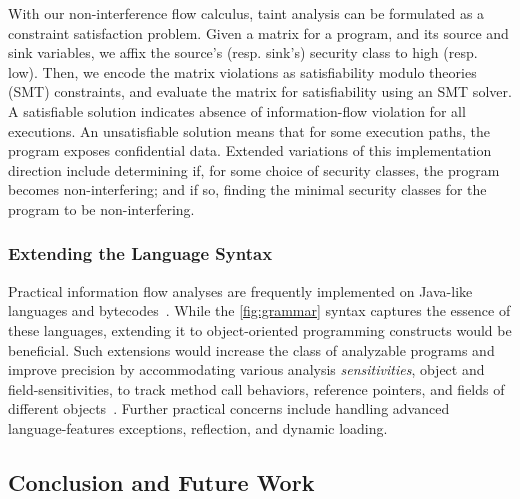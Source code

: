 With our non-interference flow calculus, taint analysis can be formulated as a constraint satisfaction problem.
Given a matrix for a program, and its source and sink variables,
we affix the source's (resp. sink's) security class to high (resp. low).
Then, we encode the matrix violations as satisfiability modulo theories (SMT) constraints, and evaluate the matrix for satisfiability using an SMT solver.
A satisfiable solution indicates absence of information-flow violation for all executions.
An unsatisfiable solution means that for some execution paths, the program exposes confidential data.
Extended variations of this implementation direction include
determining if, for some choice of security classes, the program becomes non-interfering;
and if so, finding the minimal security classes for the program to be non-interfering.

\subsubsection{Extending the Language Syntax}

Practical information flow analyses are frequently implemented on Java-like languages and bytecodes~\cite{hammer2009,huang2014,arzt2014,pauck2018}.
While the \autoref{fig:grammar} syntax captures the essence of these languages, extending it to object-oriented programming constructs would be beneficial.
Such extensions would increase the class of analyzable programs and improve precision by accommodating various analysis \emph{sensitivities},
\eg object and field-sensitivities, to track method call behaviors, reference pointers, and fields of different objects~\cite{arzt2014,hammer2009}.
Further practical concerns include handling advanced language-features \eg exceptions, reflection, and dynamic loading.


\subsection{Conclusion and Future Work}
\label{plas-conclusion}

